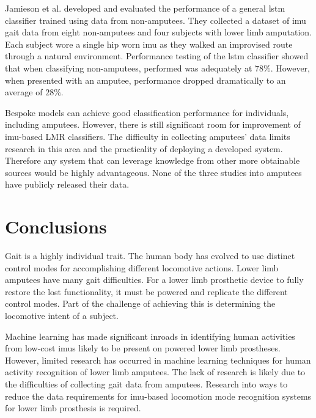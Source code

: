 Jamieson et al. developed and evaluated the performance of a general \acrshort{lstm} classifier trained using data from non-amputees. They collected a dataset of \acrshort{imu} gait data from eight non-amputees and four subjects with lower limb amputation. Each subject wore a single hip worn \acrshort{imu} as they walked an improvised route through a natural environment. Performance testing of the \acrshort{lstm} classifier showed that when classifying non-amputees, performed was adequately at $78\%$. However, when presented with an amputee, performance dropped dramatically to an average of $28\%$.\cite{Jamieson2021}

Bespoke models can achieve good classification performance for individuals, including amputees. However, there is still significant room for improvement of \acrshort{imu}-based LMR classifiers. The difficulty in collecting amputees' data limits research in this area and the practicality of deploying a developed system. Therefore any system that can leverage knowledge from other more obtainable sources would be highly advantageous. None of the three studies into amputees have publicly released their data.


\section{Conclusions}
\label{sec:background-conclusion}
Gait is a highly individual trait. The human body has evolved to use distinct control modes for accomplishing different locomotive actions. Lower limb amputees have many gait difficulties. For a lower limb prosthetic device to fully restore the lost functionality, it must be powered and replicate the different control modes. Part of the challenge of achieving this is determining the locomotive intent of a subject.

Machine learning has made significant inroads in identifying human activities from low-cost \acrshort{imu}s likely to be present on powered lower limb prostheses. However, limited research has occurred in machine learning techniques for human activity recognition of lower limb amputees. The lack of research is likely due to the difficulties of collecting gait data from amputees. Research into ways to reduce the data requirements for \acrshort{imu}-based locomotion mode recognition systems for lower limb prosthesis is required.
